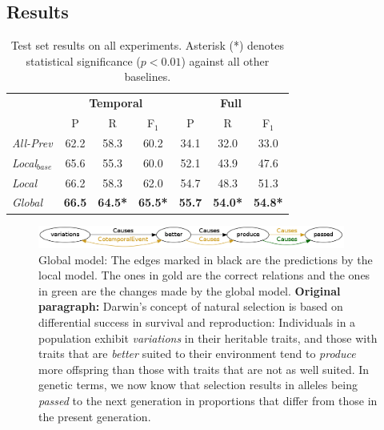 \subsection{Results}

\begin{table}[t]
{\footnotesize
\begin{tabular}{| l | c | c | c | c | c | c |}
\hline
    & \multicolumn{3}{c|}{\textbf{Temporal}} & \multicolumn{3}{c|}{\textbf{Full}} \\
    & P & R & F$_1$ & P & R & F$_1$ \\
\hline
\hline
\emph{All-Prev} & 62.2 & 58.3 & 60.2 & 34.1 & 32.0 & 33.0 \\
\emph{Local$_{base}$} & 65.6 & 55.3 & 60.0 &  52.1 & 43.9 & 47.6\\
\emph{Local} & 66.2 & 58.3 & 62.0 & 54.7 & 48.3 & 51.3 \\
\emph{Global} & \textbf{66.5} & \textbf{64.5*} & \textbf{65.5*} & \textbf{55.7} & \textbf{54.0*} & \textbf{54.8*} \\
\hline
\end{tabular}}
\caption{Test set results on all experiments. Asterisk (*) denotes statistical significance ($p<0.01$) against all other baselines.}
\label{tab:results}
\end{table}


\begin{figure}[t]
\centering
\includegraphics[width=0.9\textwidth]{figures/p144.png} 
\caption{Global model: The edges marked in black are the predictions by the local model. The ones in gold are the correct relations and the ones in green are the changes made by the global model. \textbf{Original paragraph:} Darwin's concept of natural selection is based on differential success in survival and reproduction: Individuals in a population exhibit \emph{variations} in their heritable traits, and those with traits that are \emph{better} suited to their environment tend to \emph{produce} more offspring than those with traits that are not as well suited. In genetic terms, we now know that selection results in alleles being \emph{passed} to the next generation in proportions that differ from those in the present generation.}
\label{p144correct}
\end{figure}



